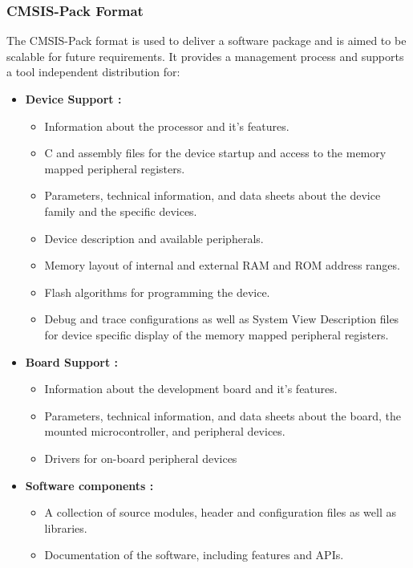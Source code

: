 \subsubsection{CMSIS-Pack Format}
The CMSIS-Pack format is used to deliver a software package and is aimed to be scalable for future requirements. It provides a management process and supports a tool independent distribution for:
\begin{itemize}
    \item \textbf{Device Support :}
    \begin{itemize}
        \item Information about the processor and it's features.
        \item C and assembly files for the device startup and access to the memory mapped peripheral registers.
        \item Parameters, technical information, and data sheets about the device family and the specific devices.
        \item Device description and available peripherals.
        \item Memory layout of internal and external RAM and ROM address ranges.
        \item Flash algorithms for programming the device.
        \item Debug and trace configurations as well as System View Description files for device specific display of the memory mapped peripheral registers. 
    \end{itemize}
    \item \textbf{Board Support :}
    \begin{itemize}
        \item Information about the development board and it's features.
        \item Parameters, technical information, and data sheets about the board, the mounted microcontroller, and peripheral devices.
        \item Drivers for on-board peripheral devices
    \end{itemize}
    \item \textbf{Software components :}
    \begin{itemize}
        \item A collection of source modules, header and configuration files as well as libraries.
        \item Documentation of the software, including features and APIs.
    \end{itemize}
\end{itemize}
